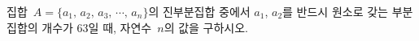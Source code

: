 집합~$A=\{a_1,\,a_2,\,a_3,\,\cdots,\,a_n\}$의 진부분집합 중에서 $a_1$, $a_2$를 반드시 원소로 갖는 부분집합의 개수가 $63$일 때, 자연수~$n$의 값을 구하시오.
